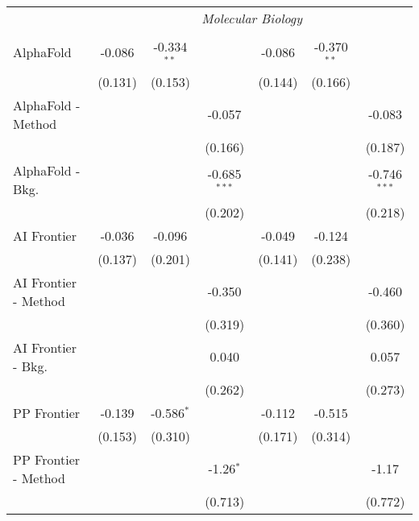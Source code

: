 \begin{tabular}{lcccccc}
 & \multicolumn{6}{c}{\textit{Molecular Biology}} \\ \\
   AlphaFold            & -0.086         & -0.334$^{**}$ &                & -0.086        & -0.370$^{**}$ &   \\   
                        & (0.131)        & (0.153)       &                & (0.144)       & (0.166)       &   \\   
   AlphaFold - Method   &                &               & -0.057         &               &               & -0.083\\   
                        &                &               & (0.166)        &               &               & (0.187)\\   
   AlphaFold - Bkg.     &                &               & -0.685$^{***}$ &               &               & -0.746$^{***}$\\   
                        &                &               & (0.202)        &               &               & (0.218)\\   
   AI Frontier          & -0.036         & -0.096        &                & -0.049        & -0.124        &   \\   
                        & (0.137)        & (0.201)       &                & (0.141)       & (0.238)       &   \\   
   AI Frontier - Method &                &               & -0.350         &               &               & -0.460\\   
                        &                &               & (0.319)        &               &               & (0.360)\\   
   AI Frontier - Bkg.   &                &               & 0.040          &               &               & 0.057\\   
                        &                &               & (0.262)        &               &               & (0.273)\\   
   PP Frontier          & -0.139         & -0.586$^{*}$  &                & -0.112        & -0.515        &   \\   
                        & (0.153)        & (0.310)       &                & (0.171)       & (0.314)       &   \\   
   PP Frontier - Method &                &               & -1.26$^{*}$    &               &               & -1.17\\   
                        &                &               & (0.713)        &               &               & (0.772)\\   

\end{tabular}
